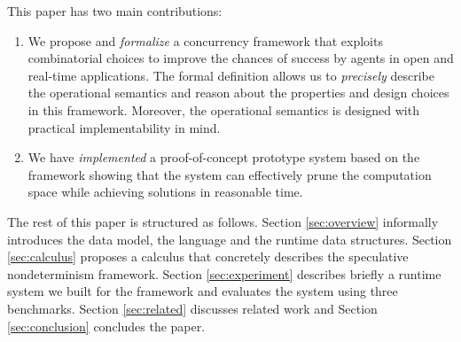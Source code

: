 % 
% 
% 
% 

This paper has two main contributions:
\begin{enumerate}
\item We propose and {\em formalize} a concurrency framework that 
exploits combinatorial choices to improve the chances of success
by agents in open and real-time applications.
The formal definition allows us to {\em precisely}
describe the operational semantics and reason about the properties and
design choices in this framework.
Moreover, the operational semantics is designed with practical
implementability in mind.
\item We have {\em implemented} a proof-of-concept prototype system 
based on the framework showing
that the system can effectively prune the 
computation space while achieving solutions in reasonable time.
\end{enumerate}


The rest of this paper is structured as follows.
Section \ref{sec:overview} informally introduces the data model, 
the language and the runtime data structures.
Section \ref{sec:calculus} proposes a calculus that concretely
describes the speculative nondeterminism framework.
Section \ref{sec:experiment} describes briefly a runtime system we
built for the framework and evaluates the system using
three benchmarks.
Section \ref{sec:related} discusses related work and
Section \ref{sec:conclusion} concludes the paper.
